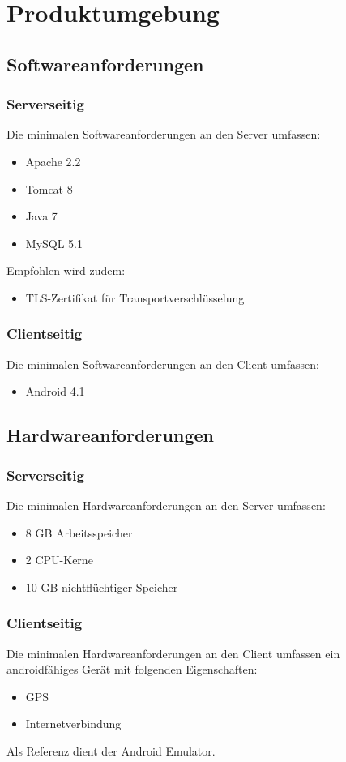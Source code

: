 \section{Produktumgebung}
\subsection{Softwareanforderungen}

\subsubsection{Serverseitig}
Die minimalen Softwareanforderungen an den Server umfassen:
\begin{itemize}
\item Apache 2.2
\item Tomcat 8
\item Java 7
\item MySQL 5.1

\end{itemize}

Empfohlen wird zudem:
\begin{itemize}
\item TLS-Zertifikat für Transportverschlüsselung
\end{itemize}

\subsubsection{Clientseitig}
Die minimalen Softwareanforderungen an den Client umfassen:
\begin{itemize}
\item Android 4.1

\end{itemize}


\subsection{Hardwareanforderungen}
\subsubsection{Serverseitig}
Die minimalen Hardwareanforderungen an den Server umfassen:
\begin{itemize}
\item 8 GB Arbeitsspeicher
\item 2 CPU-Kerne
\item 10 GB nichtflüchtiger Speicher
\end{itemize}

\subsubsection{Clientseitig}
Die minimalen Hardwareanforderungen an den Client umfassen ein androidfähiges Gerät mit folgenden Eigenschaften:
\begin{itemize}
\item GPS
\item Internetverbindung
\end{itemize}

Als Referenz dient der Android Emulator.


